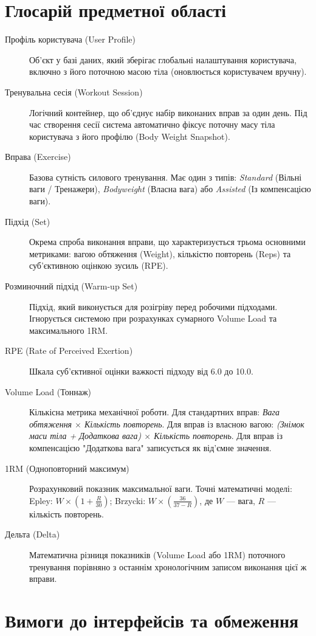 \documentclass[12pt]{article}
\begin{document}
\section{Глосарій предметної області}
\begin{description}
    \item[Профіль користувача (User Profile)] Об'єкт у базі даних, який зберігає глобальні налаштування користувача, включно з його поточною масою тіла (оновлюється користувачем вручну).
    \item[Тренувальна сесія (Workout Session)] Логічний контейнер, що об'єднує набір виконаних вправ за один день. Під час створення сесії система автоматично фіксує поточну масу тіла користувача з його профілю (Body Weight Snapshot).
    \item[Вправа (Exercise)] Базова сутність силового тренування. Має один з типів: \textit{Standard} (Вільні ваги / Тренажери), \textit{Bodyweight} (Власна вага) або \textit{Assisted} (Із компенсацією ваги).
    \item[Підхід (Set)] Окрема спроба виконання вправи, що характеризується трьома основними метриками: вагою обтяження (Weight), кількістю повторень (Reps) та суб'єктивною оцінкою зусиль (RPE).
    \item[Розминочний підхід (Warm-up Set)] Підхід, який виконується для розігріву перед робочими підходами. Ігнорується системою при розрахунках сумарного Volume Load та максимального 1RM.
    \item[RPE (Rate of Perceived Exertion)] Шкала суб'єктивної оцінки важкості підходу від 6.0 до 10.0.
    \item[Volume Load (Тоннаж)] Кількісна метрика механічної роботи. Для стандартних вправ: \textit{Вага обтяження $\times$ Кількість повторень}. Для вправ із власною вагою: \textit{(Знімок маси тіла + Додаткова вага) $\times$ Кількість повторень}. Для вправ із компенсацією "Додаткова вага" записується як від'ємне значення.
    \item[1RM (Одноповторний максимум)] Розрахунковий показник максимальної ваги. Точні математичні моделі: Epley: $W \times (1 + \frac{R}{30})$; Brzycki: $W \times (\frac{36}{37 - R})$, де $W$ — вага, $R$ — кількість повторень.
    \item[Дельта (Delta)] Математична різниця показників (Volume Load або 1RM) поточного тренування порівняно з останнім хронологічним записом виконання цієї ж вправи.
\end{description}

\section{Вимоги до інтерфейсів та обмеження}
\end{document}
